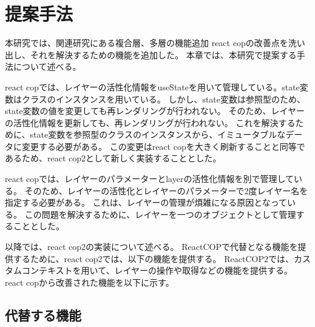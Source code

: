\documentclass{jsarticle}
\begin{document}
\fi
\section{提案手法}
本研究では、関連研究にある複合層、多層の機能追加
react copの改善点を洗い出し、それを解決するための機能を追加した。
本章では、本研究で提案する手法について述べる。

react copでは、レイヤーの活性化情報をuseStateを用いて管理している。state変数はクラスのインスタンスを用いている。
しかし、state変数は参照型のため、state変数の値を変更しても再レンダリングが行われない。
そのため、レイヤーの活性化情報を更新しても、再レンダリングが行われない。
これを解決するために、state変数を参照型のクラスのインスタンスから、イミュータブルなデータに変更する必要がある。
この変更はreact copを大きく刷新することと同等であるため、react cop2として新しく実装することとした。

react copでは、レイヤーのパラメーターとlayerの活性化情報を別で管理している。
そのため、レイヤーの活性化とレイヤーのパラメーターで2度レイヤー名を指定する必要がある。
これは、レイヤーの管理が煩雑になる原因となっている。
この問題を解決するために、レイヤーを一つのオブジェクトとして管理することとした。

以降では、react cop2の実装について述べる。
ReactCOPで代替となる機能を提供するために、react cop2では、以下の機能を提供する。
ReactCOP2では、カスタムコンテキストを用いて、レイヤーの操作や取得などの機能を提供する。
react copから改善された機能を以下に示す。



\subsection{代替する機能}
\end{document}
